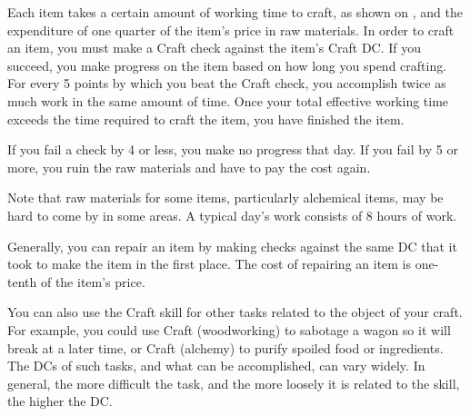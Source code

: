 \begin{comment}
To determine the time required to craft an item, consult the table below.
\begin{dtable*}
  \lcaption{Crafting Time}
  \begin{tabularx}{\columnwidth}{l X}
    \thead{Item Price} & \thead{Crafting Time} \\
    1gp or less & 1 hour per sp (minimum 1 hour) \\
    10gp or less & 1 day per 2 gp (minimum 1 day) \\
    100gp or less & 5 days \add 1 day per 4 gp \\
    1000gp or less & 30 days \add 1 day per 100 gp \\
  \end{tabularx}
\end{dtable*}
\end{comment}

Each item takes a certain amount of working time to craft, as shown on , and the expenditure of one quarter of the item's price in raw materials. In order to craft an item, you must make a Craft check against the item's Craft DC. If you succeed, you make progress on the item based on how long you spend crafting. For every 5 points by which you beat the Craft check, you accomplish twice as much work in the same amount of time. Once your total effective working time exceeds the time required to craft the item, you have finished the item.

If you fail a check by 4 or less, you make no progress that day. If you fail by 5 or more, you ruin the raw materials and have to pay the cost again.

Note that raw materials for some items, particularly alchemical items, may be hard to come by in some areas. A typical day's work consists of 8 hours of work.

 Generally, you can repair an item by making checks against the same DC that it took to make the item in the first place. The cost of repairing an item is one-tenth of the item's price.

 You can also use the Craft skill for other tasks related to the object of your craft. For example, you could use Craft (woodworking) to sabotage a wagon so it will break at a later time, or Craft (alchemy) to purify spoiled food or ingredients. The DCs of such tasks, and what can be accomplished, can vary widely. In general, the more difficult the task, and the more loosely it is related to the skill, the higher the DC. 

